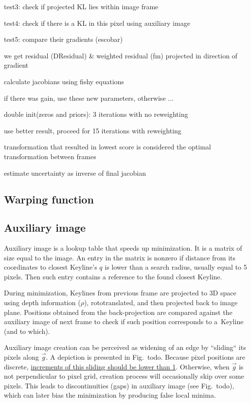 	 test3: check if projected KL lies within image frame

       test4: check if there is a KL in this pixel using auxiliary image

       test5: compare their gradients (escobar)

       we get residual (DResidual) \& weighted residual (fm) projected in direction of gradient

     calculate jacobians using fishy equations

     if there was gain, use these new parameters, otherwise ...

double init(zeros and priors): 3 iterations with no reweighting

use better result, proceed for 15 iterations with reweighting

transformation that resulted in lowest score is considered the optimal transformation between frames

estimate uncertainty as inverse of final jacobian

\subsection{Warping function}

\subsection{Auxiliary image}

Auxiliary image is a lookup table that speeds up minimization. It is a matrix of size equal to the image. An entry in the matrix is nonzero if distance from its coordinates to closest Keyline's $q$ is lower than a search radius, usually equal to 5 pixels. Then such entry contains a reference to the found closest Keyline.

During minimization, Keylines from previous frame are projected to 3D space using depth information ($\rho$), rototranslated, and then projected back to image plane. Positions obtained from the back-projection are compared against the auxiliary image of next frame to check if such position corresponds to a~Keyline (and to which).

Auxiliary image creation can be perceived as widening of an edge by ``sliding`` its pixels along $\vec{g}$. A depiction is presented in Fig.~todo. Because pixel positions are discrete, \underline{increments of this sliding should be lower than 1}. Otherwise, when $\vec{g}$ is not perpendicular to pixel grid, creation process will occasionally skip over some pixels. This leads to discontinuities (gaps) in auxiliary image (see Fig.~todo), which can later bias the minimization by producing false local minima.

